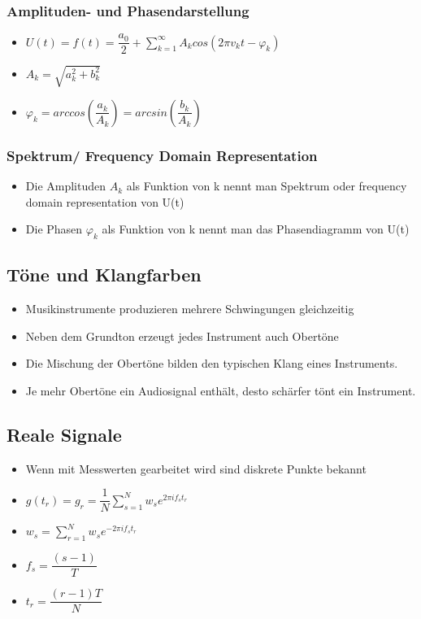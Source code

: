 \documentclass[8pt,a4paper]{scrartcl}
\begin{document}
\begin{multicols*}{3}
							\subsubsection{Amplituden- und Phasendarstellung}
								\begin{itemize}\itemsep0pt
									\item $U(t) = f(t)=\dfrac{a_{0}}{2}+\sum_{k=1}^{\infty} A_{k} cos(2\pi v_{k}t - \varphi_{k})$
									\item $A_{k}=\sqrt{a_{k}^{2} + b_{k}^{2}}$
									\item $\varphi_{k} = arccos(\dfrac{a_{k}}{A_{k}}) =arcsin(\dfrac{b_{k}}{A_{k}}) $
								\end{itemize}	
								
								
							\subsubsection{Spektrum/ Frequency Domain Representation}
								\begin{itemize}\itemsep0pt
									\item Die Amplituden $A_{k}$ als Funktion von k nennt man Spektrum oder frequency domain representation von U(t)
									\item Die Phasen $\varphi_{k}$ als Funktion von k nennt man das Phasendiagramm von U(t)
								\end{itemize}	
								
								
						\subsection{Töne und Klangfarben}		
							\begin{itemize}\itemsep0pt
								\item Musikinstrumente produzieren mehrere Schwingungen gleichzeitig
								\item Neben dem Grundton erzeugt jedes Instrument auch Obertöne
								\item Die Mischung der Obertöne bilden den typischen Klang eines Instruments.
								\item Je mehr Obertöne ein Audiosignal enthält, desto schärfer tönt ein Instrument.
							\end{itemize}	
						
						\subsection{Reale Signale}		
							\begin{itemize}\itemsep0pt
								\item Wenn mit Messwerten gearbeitet wird sind diskrete Punkte bekannt
								\item $g(t_{r}) = g_{r} = \dfrac{1}{N} \sum_{s=1}^{N} w_{s} e^{2\pi i f_{s}t_{r}}$
								\item $w_{s}  = \sum_{r=1}^{N} w_{s} e^{-2\pi i f_{s}t_{r}}$
								\item $f_{s} = \dfrac{(s-1)}{T}$
								\item $t_{r} = \dfrac{(r-1)T}{N}$
							\end{itemize}	
							

\end{multicols*}
\end{document}
